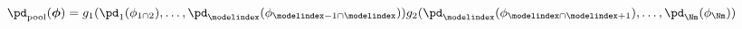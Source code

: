 \begin{equation}
  \pd_{\text{pool}}(\boldsymbol{\phi}) = 
  g_{1}(\pd_{1}(\phi_{1 \cap 2}), \ldots, \pd_{\modelindex}(\phi_{\modelindex - 1 \cap \modelindex}))
  g_{2}(\pd_{\modelindex}(\phi_{\modelindex \cap \modelindex + 1}), \ldots, \pd_{\Nm}(\phi_{\Nm}))
  \label{eqn:pooled-prior-split-def}
\end{equation}
